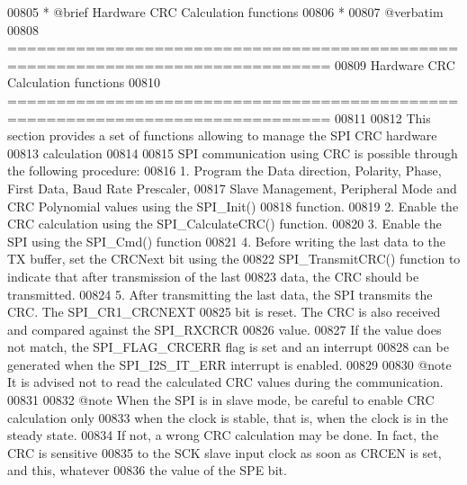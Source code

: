 \begin{DoxyCode}
00805 \textcolor{comment}{ *  @brief   Hardware CRC Calculation functions}
00806 \textcolor{comment}{ *}
00807 \textcolor{comment}{@verbatim   }
00808 \textcolor{comment}{ ===============================================================================}
00809 \textcolor{comment}{                         Hardware CRC Calculation functions}
00810 \textcolor{comment}{ ===============================================================================  }
00811 \textcolor{comment}{}
00812 \textcolor{comment}{  This section provides a set of functions allowing to manage the SPI CRC hardware }
00813 \textcolor{comment}{  calculation}
00814 \textcolor{comment}{}
00815 \textcolor{comment}{  SPI communication using CRC is possible through the following procedure:}
00816 \textcolor{comment}{     1. Program the Data direction, Polarity, Phase, First Data, Baud Rate Prescaler, }
00817 \textcolor{comment}{        Slave Management, Peripheral Mode and CRC Polynomial values using the SPI\_Init()}
00818 \textcolor{comment}{        function.}
00819 \textcolor{comment}{     2. Enable the CRC calculation using the SPI\_CalculateCRC() function.}
00820 \textcolor{comment}{     3. Enable the SPI using the SPI\_Cmd() function}
00821 \textcolor{comment}{     4. Before writing the last data to the TX buffer, set the CRCNext bit using the }
00822 \textcolor{comment}{      SPI\_TransmitCRC() function to indicate that after transmission of the last }
00823 \textcolor{comment}{      data, the CRC should be transmitted.}
00824 \textcolor{comment}{     5. After transmitting the last data, the SPI transmits the CRC. The SPI\_CR1\_CRCNEXT}
00825 \textcolor{comment}{        bit is reset. The CRC is also received and compared against the SPI\_RXCRCR }
00826 \textcolor{comment}{        value. }
00827 \textcolor{comment}{        If the value does not match, the SPI\_FLAG\_CRCERR flag is set and an interrupt}
00828 \textcolor{comment}{        can be generated when the SPI\_I2S\_IT\_ERR interrupt is enabled.}
00829 \textcolor{comment}{}
00830 \textcolor{comment}{@note It is advised not to read the calculated CRC values during the communication.}
00831 \textcolor{comment}{}
00832 \textcolor{comment}{@note When the SPI is in slave mode, be careful to enable CRC calculation only }
00833 \textcolor{comment}{      when the clock is stable, that is, when the clock is in the steady state. }
00834 \textcolor{comment}{      If not, a wrong CRC calculation may be done. In fact, the CRC is sensitive }
00835 \textcolor{comment}{      to the SCK slave input clock as soon as CRCEN is set, and this, whatever }
00836 \textcolor{comment}{      the value of the SPE bit.}

\end{DoxyCode}
